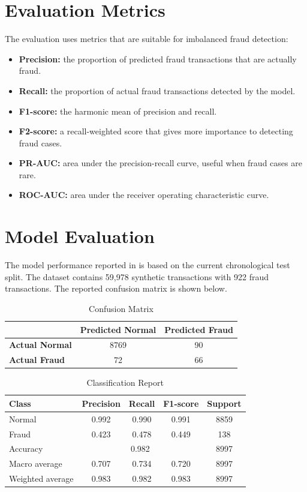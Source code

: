 \documentclass[12pt,a4paper]{report}
\begin{document}
\section{Evaluation Metrics}
The evaluation uses metrics that are suitable for imbalanced fraud detection:
\begin{itemize}
    \item \textbf{Precision:} the proportion of predicted fraud transactions that are actually fraud.
    \item \textbf{Recall:} the proportion of actual fraud transactions detected by the model.
    \item \textbf{F1-score:} the harmonic mean of precision and recall.
    \item \textbf{F2-score:} a recall-weighted score that gives more importance to detecting fraud cases.
    \item \textbf{PR-AUC:} area under the precision-recall curve, useful when fraud cases are rare.
    \item \textbf{ROC-AUC:} area under the receiver operating characteristic curve.
\end{itemize}

\section{Model Evaluation}
The model performance reported in  is based on the current chronological test split. The dataset contains 59,978 synthetic transactions with 922 fraud transactions. The reported confusion matrix is shown below.

\begin{table}[H]
\centering
\caption{Confusion Matrix}
\begin{tabular}{lcc}
\toprule
 & \textbf{Predicted Normal} & \textbf{Predicted Fraud} \\
\midrule
\textbf{Actual Normal} & 8769 & 90 \\
\textbf{Actual Fraud} & 72 & 66 \\
\bottomrule
\end{tabular}
\end{table}

\begin{table}[H]
\centering
\caption{Classification Report}
\begin{tabular}{lcccc}
\toprule
\textbf{Class} & \textbf{Precision} & \textbf{Recall} & \textbf{F1-score} & \textbf{Support} \\
\midrule
Normal & 0.992 & 0.990 & 0.991 & 8859 \\
Fraud & 0.423 & 0.478 & 0.449 & 138 \\
\midrule
Accuracy & \multicolumn{3}{c}{0.982} & 8997 \\
Macro average & 0.707 & 0.734 & 0.720 & 8997 \\
Weighted average & 0.983 & 0.982 & 0.983 & 8997 \\
\bottomrule
\end{tabular}
\end{table}
\end{document}
